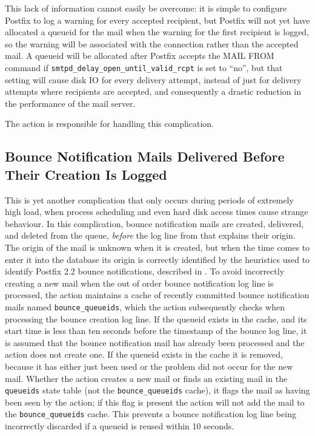 This lack of information cannot easily be overcome: it is simple to
configure Postfix to log a warning for every accepted recipient, but
Postfix will not yet have allocated a queueid for the mail when the warning
for the first recipient is logged, so the warning will be associated with
the connection rather than the accepted mail.  A queueid will be allocated
after Postfix accepts the MAIL FROM command if
\texttt{smtpd\_delay\_open\_until\_valid\_rcpt} is set to ``no'', but that
setting will cause disk IO for every delivery attempt, instead of just for
delivery attempts where recipients are accepted, and consequently a drastic
reduction in the performance of the mail server.

The  action is responsible for handling this complication.

\subsection[Bounce Notification Mails Delivered Before Their Creation Is
Logged]{Bounce Notification Mails Delivered Before \newline{} Their
Creation Is Logged}

\label{Bounce notification mails delivered before their creation is logged}

This is yet another complication that only occurs during periods of
extremely high load, when process scheduling and even hard disk access
times cause strange behaviour.  In this complication, bounce notification
mails are created, delivered, and deleted from the queue, \textit{before\/}
the log line from  that explains their origin.  The origin
of the mail is unknown when it is created, but when the time comes to enter
it into the database its origin is correctly identified by the heuristics
used to identify Postfix 2.2 bounce notifications, described in
.  To avoid incorrectly
creating a new mail when the out of order bounce notification log line is
processed, the  action maintains a cache of recently
committed bounce notification mails named \texttt{bounce\_queueids}, which
the  action subsequently checks when processing the
bounce creation log line.  If the queueid exists in the cache, and its
start time is less than ten seconds before the timestamp of the bounce log
line, it is assumed that the bounce notification mail has already been
processed and the  action does not create one.  If
the queueid exists in the cache it is removed, because it has either just
been used or the problem did not occur for the new mail.  Whether the
 action creates a new mail or finds an existing
mail in the \texttt{queueids} state table (not the
\texttt{bounce\_queueids} cache), it flags the mail as having been seen by
the  action; if this flag is present the
 action will not add the mail to the
\texttt{bounce\_queueids} cache.  This prevents a bounce notification log
line being incorrectly discarded if a queueid is reused within 10 seconds.

